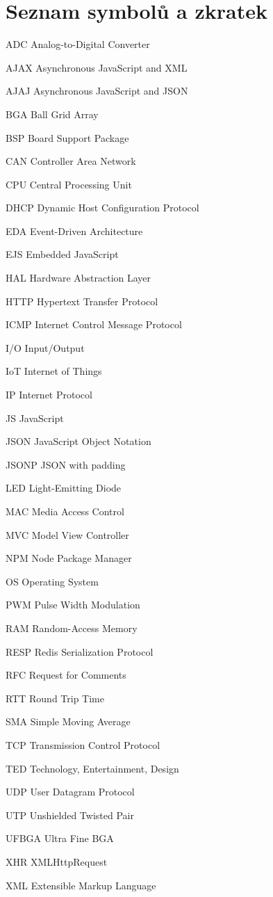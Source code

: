 \documentclass[oneside,12pt,a4paper,draft]{book} %
\makeatletter
\newcommand{\tocfill}{\cleaders\hbox{$\m@th \mkern\@dotsep mu . \mkern\@dotsep mu$}\hfill}
\newcommand{\abbrlabel}[1]{\makebox[6cm][l]{\textbf{#1}\ \tocfill}}
\newenvironment{abbreviations}{\begin{list}{}{\renewcommand{\makelabel}{\abbrlabel}%
        \setlength{\labelwidth}{6cm}\setlength{\leftmargin}{\labelwidth+\labelsep}%
                                              \setlength{\itemsep}{0pt}}}{\end{list}}
\makeatother
\begin{document}
\chapter*{Seznam symbolů a zkratek}
\noindent
\begin{abbreviations}
\item[ADC]		Analog-to-Digital Converter
\item[AJAX]		Asynchronous JavaScript and XML
\item[AJAJ]		Asynchronous JavaScript and JSON
\item[BGA]		Ball Grid Array
\item[BSP]		Board Support Package
\item[CAN]		Controller Area Network
\item[CPU]		Central Processing Unit
\item[DHCP]		Dynamic Host Configuration Protocol
\item[EDA]		Event-Driven Architecture
\item[EJS]		Embedded JavaScript
\item[HAL]		Hardware Abstraction Layer
\item[HTTP]		Hypertext Transfer Protocol
\item[ICMP]		Internet Control Message Protocol
\item[I/O]		Input/Output
\item[IoT]		Internet of Things
\item[IP]		Internet Protocol
\item[JS]		JavaScript
\item[JSON]		JavaScript Object Notation
\item[JSONP]	JSON with padding
\item[LED]		Light-Emitting Diode
\item[MAC]		Media Access Control
\item[MVC]		Model View Controller
\item[NPM]		Node Package Manager
\item[OS]		Operating System
\item[PWM]		Pulse Width Modulation
\item[RAM]		Random-Access Memory
\item[RESP]		Redis Serialization Protocol
\item[RFC]		Request for Comments
\item[RTT]		Round Trip Time
\item[SMA]		Simple Moving Average
\item[TCP]		Transmission Control Protocol
\item[TED]		Technology, Entertainment, Design
\item[UDP]		User Datagram Protocol
\item[UTP]		Unshielded Twisted Pair
\item[UFBGA]	Ultra Fine BGA
\item[XHR]		XMLHttpRequest
\item[XML]		Extensible Markup Language
\end{abbreviations}
\end{document}
